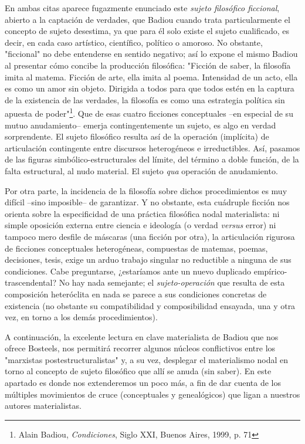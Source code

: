 En ambas citas aparece fugazmente enunciado este \emph{sujeto filosófico
ficcional}, abierto a la captación de verdades, que Badiou cuando trata
particularmente el concepto de sujeto desestima, ya que para él solo
existe el sujeto cualificado, es decir, en cada caso artístico,
científico, político o amoroso. No obstante, "ficcional" no debe
entenderse en sentido negativo; así lo expone el mismo Badiou al
presentar cómo concibe la producción filosófica: "Ficción de saber, la
filosofía imita al matema. Ficción de arte, ella imita al poema.
Intensidad de un acto, ella es como un amor sin objeto. Dirigida a todos
para que todos estén en la captura de la existencia de las verdades, la
filosofía es como una estrategia política sin apuesta de
poder"\footnote{Alain Badiou, \emph{Condiciones}, Siglo XXI, Buenos
  Aires, 1999, p. 71}. Que de esas cuatro ficciones conceptuales --en
especial de su mutuo anudamiento-- emerja contingentemente un sujeto, es
algo en verdad sorprendente. El sujeto filosófico resulta así de la
operación (implícita) de articulación contingente entre discursos
heterogéneos e irreductibles. Así, pasamos de las figuras
simbólico-estructurales del límite, del término a doble función, de la
falta estructural, al nudo material. El sujeto \emph{qua} operación de
anudamiento.

Por otra parte, la incidencia de la filosofía sobre dichos
procedimientos es muy difícil --sino imposible-- de garantizar. Y no
obstante, esta cuádruple ficción nos orienta sobre la especificidad de
una práctica filosófica nodal materialista: ni simple oposición externa
entre ciencia e ideología (o verdad \emph{versus} error) ni tampoco mero
desfile de máscaras (una ficción por otra), la articulación rigurosa de
ficciones conceptuales heterogéneas, compuestas de matemas, poemas,
decisiones, tesis, exige un arduo trabajo singular no reductible a
ninguna de sus condiciones. Cabe preguntarse, ¿estaríamos ante un nuevo
duplicado empírico-trascendental? No hay nada semejante; el
\emph{sujeto-operación} que resulta de esta composición heteróclita en
nada se parece a sus condiciones concretas de existencia (no obstante su
compatibilidad y composibilidad ensayada, una y otra vez, en torno a los
demás procedimientos).

A continuación, la excelente lectura en clave materialista de Badiou que
nos ofrece Bosteels, nos permitirá recorrer algunos núcleos conflictivos
entre los "marxistas postestructuralistas" y, a su vez, desplegar el
materialismo nodal en torno al concepto de sujeto filosófico que allí se
anuda (sin saber). En este apartado es donde nos extenderemos un poco
más, a fin de dar cuenta de los múltiples movimientos de cruce
(conceptuales y genealógicos) que ligan a nuestros autores
materialistas.


